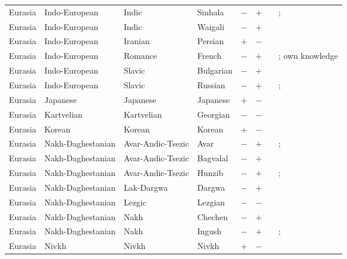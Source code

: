 \begin{landscape}
\begin{longtable}{l>{\raggedright\arraybackslash}p{2.2cm}>{\raggedright}p{2.5cm}>{\raggedright\arraybackslash}p{2.5cm}cc>{\raggedright\arraybackslash}p{3.4cm}>{\raggedright\arraybackslash}p{3.4cm}}
Eurasia & Indo-European & Indic & Sinhala & $-$ & $+$ & \citealt{Gil2013} & \citealt[passim]{Henadeerage2002}; \citealt[79--82, 228--229]{Chandralai2010}\\
Eurasia & Indo-European & Indic & Waigali & $-$ & $+$ & \citealt{Gil2013} & \citealt[297]{Nichols1992}\\
Eurasia & Indo-European & Iranian & Persian & $+$ & $-$ & \citealt{Gil2013} & \citealt{Corbett2013}\\
Eurasia & Indo-European & Romance & French & $-$ & $+$ & \citealt{Gil2013} & \citealt{Corbett2013}; own knowledge\\
Eurasia & Indo-European & Slavic & Bulgarian & $-$ & $+$ & \citealt{Gil2013} & \citealt[86--89]{Nicolova2017}\\
Eurasia & Indo-European & Slavic & Russian & $-$ & $+$ & \citealt{Gil2013} & \citealt{Corbett2013}; \citealt[54]{Wade2011}\\
Eurasia & Japanese & Japanese & Japanese & $+$ & $-$ & \citealt{Gil2013} & \citealt[passim]{Kaiser2001}\\
Eurasia & Kartvelian & Kartvelian & Georgian & $-$ & $-$ & \citealt{Gil2013} & \citealt{Corbett2013}\\
Eurasia & Korean & Korean & Korean & $+$ & $-$ & \citealt{Gil2013} & \citealt[297]{Nichols1992}\\
Eurasia & Nakh-Daghestanian & Avar-Andic-Tsezic & Avar & $-$ & $+$ & \citealt{Gil2013} & \citealt[29--30]{Charachidze1981}; \citealt[155--156]{Berg2005}\\
Eurasia & Nakh-Daghestanian & Avar-Andic-Tsezic & Bagvalal & $-$ & $+$ & \citealt{Gil2013} & \citealt[749--750]{Corbett2006}\\
Eurasia & Nakh-Daghestanian & Avar-Andic-Tsezic & Hunzib & $-$ & $+$ & \citealt{Gil2013} & \citealt{Corbett2013}; \citealt[1367]{Berg2004}\\
Eurasia & Nakh-Daghestanian & Lak-Dargwa & Dargwa & $-$ & $+$ & \citealt{Gil2013} & \citealt[156--158]{Berg2005}\\
Eurasia & Nakh-Daghestanian & Lezgic & Lezgian & $-$ & $-$ & \citealt{Gil2013} & \citealt{Corbett2013}\\
Eurasia & Nakh-Daghestanian & Nakh & Chechen & $-$ & $+$ & \citealt{Gil2013} & \citealt[37]{Nichols1994}\\
Eurasia & Nakh-Daghestanian & Nakh & Ingush & $-$ & $+$ & \citealt{Gil2013} & \citealt{Corbett2013}; \citealt[141--142]{Nichols2011}\\
Eurasia & Nivkh & Nivkh & Nivkh & $+$ & $-$ & \citealt{Gil2013} & \citealt{Corbett2013}\\

\end{longtable}
\end{landscape}
